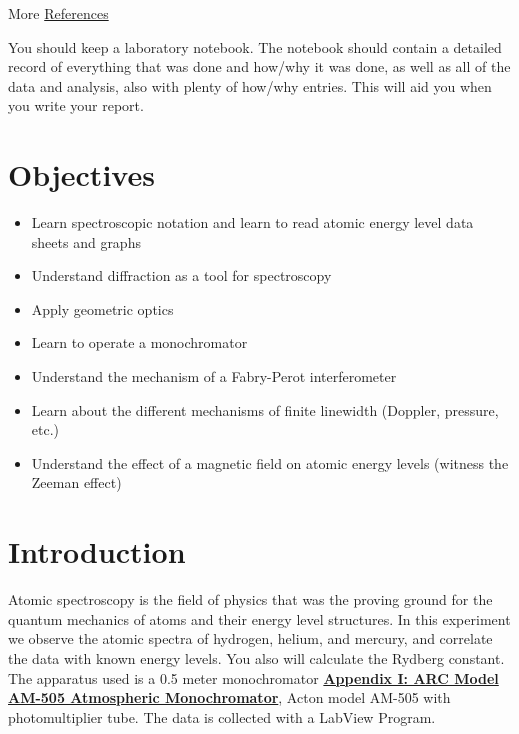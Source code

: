 \documentclass{../lab}
\begin{document}
\noindent More \hyperref[sec:References]{References}

You should keep a laboratory notebook. The notebook should contain a detailed record of everything that was done and how/why it was done, as well as all of the data and analysis, also with plenty of how/why entries. This will aid you when you write your report.

\section{Objectives}

\begin{itemize}
    \item Learn spectroscopic notation and learn to read atomic energy level data sheets and graphs

    \item Understand diffraction as a tool for spectroscopy

    \item Apply geometric optics

    \item Learn to operate a monochromator

    \item Understand the mechanism of a Fabry-Perot interferometer

    \item Learn about the different mechanisms of finite linewidth (Doppler, pressure, etc.)

    \item Understand the effect of a magnetic field on atomic energy levels (witness the Zeeman effect)

\end{itemize}

\section{Introduction}

Atomic spectroscopy is the field of physics that was the proving ground for the quantum mechanics of atoms and their energy level structures. In this experiment we observe the atomic spectra of hydrogen, helium, and mercury, and correlate the data with known energy levels. You also will calculate the Rydberg constant. The apparatus used is a 0.5 meter monochromator \href{http://experimentationlab.berkeley.edu/ATMAppendix1}{\textbf{Appendix I: ARC Model AM-505 Atmospheric Monochromator}}, Acton model AM-505 with photomultiplier tube. The data is collected with a LabView Program.
\end{document}
